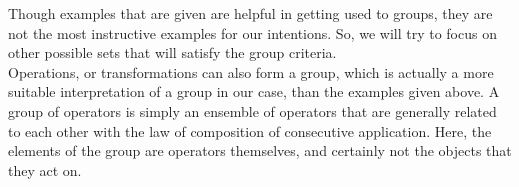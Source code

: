 Though examples that are given are helpful in getting used to groups, they are not the most instructive examples for our intentions. So, we will try to focus on other possible sets that will satisfy the group criteria.\\

Operations, or transformations can also form a group, which is actually a
more suitable interpretation of a group in our case, than the examples given above. A group of operators is simply an ensemble of operators that are generally related to each other with the law of composition of consecutive application.  Here, the elements of the group are operators themselves, and certainly not the objects that they act on.

